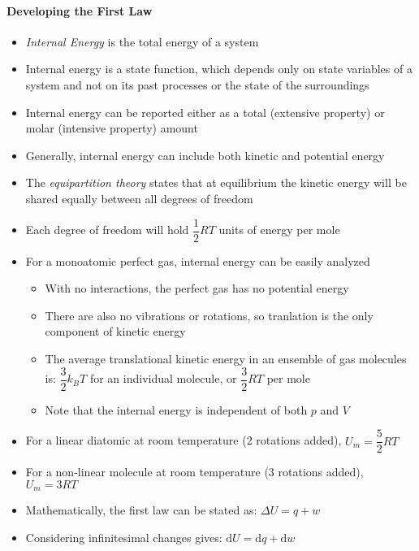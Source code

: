 \documentclass[12pt, openany, letterpaper]{memoir}
\begin{document}
\paragraph{Developing the First Law}
\begin{itemize}
	\item \emph{Internal Energy} is the total energy of a system
	\item Internal energy is a state function, which depends only on state variables of a system and not on its past processes or the state of the surroundings
	\item Internal energy can be reported either as a total (extensive property) or molar (intensive property) amount
	\item Generally, internal energy can include both kinetic and potential energy
	\item The \emph{equipartition theory} states that at equilibrium the kinetic energy will be shared equally between all degrees of freedom
	\item Each degree of freedom will hold $\dfrac{1}{2}RT$ units of energy per mole
	\item For a monoatomic perfect gas, internal energy can be easily analyzed
	\begin{itemize}
		\item With no interactions, the perfect gas has no potential energy
		\item There are also no vibrations or rotations, so tranlation is the only component of kinetic energy
		\item The average translational kinetic energy in an ensemble of gas molecules is: $\dfrac{3}{2}k_BT$ for an individual molecule, or $\dfrac{3}{2}RT$ per mole
		\item Note that the internal energy is independent of both $p$ and $V$
	\end{itemize}
	\item For a linear diatomic at room temperature (2 rotations added), $U_m = \dfrac{5}{2}RT$
	\item For a non-linear molecule at room temperature (3 rotations added), $U_m = 3RT$
	\item Mathematically, the first law can be stated as: $\Delta U = q + w$
	\item Considering infinitesimal changes gives: $\mathrm{d}U = \mathrm{d}q + \mathrm{d}w$
\end{itemize}
\end{document}
